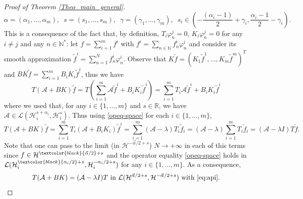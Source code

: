 \documentclass[11pt, dvipsnames]{amsart}
\begin{document}
\begin{proof}[Proof of Theorem \ref{Theo_main_general}]
\begin{equation}
\label{eq:api}
    \alpha = (\alpha_{1},...,\alpha_{m}),\;\;s = (s_{1},...,s_{m}),\;\;\gamma=(\gamma_{1},...,\gamma_{m}),\;\;s_{i}\in\left(-\frac{(\alpha_{i}-1)}{2}+\gamma_{i},\frac{\alpha_{i}-1}{2}-\gamma_{i}\right).
\end{equation}
This is a consequence of the fact that, by definition, $T_{i}\varphi_{n}^{j}=0$, $K_{i}\varphi_{n}^{j}=0$ for any $i\neq j$ and any $n\in\mathbb{N}^{*}$: let $f = \sum_{i=1}^{m}f^{i}$ with $f^{i} = \sum_{n\in\mathbb{N}}f_{n}^{i}\varphi_{n}^{i}$ and consider its smooth approximation $\tilde{f}^{i} = \sum_{n=1}^{N}f_{n}^{i}\varphi_{n}^{i}$. Observe that $K\tilde{f} =(K_{1}\tilde{f}^{1},...,K_{m}\tilde{f}^{m})^{T}$ and $BK\tilde{f} = \sum\limits_{i=1}^{m}B_{i}K_{i}\tilde{f}^{i}$, thus we have
\begin{equation}
    T(\mathcal{A}+BK)\tilde{f} = T\left(\sum\limits_{i=1}^{m}\mathcal{A}\tilde{f}^{i}+B_{i}K_{i}\tilde{f}^{i}\right) = \sum\limits_{i=1}^{m} T_{i}\mathcal{A}\tilde{f}^{i}+B_{i}K_{i}\tilde{f}^{i}
\end{equation}
where we used that, for any $i\in\{1,...,m\}$ and $s\in\mathbb{R}$, we have $\mathcal{A} \in\mathcal{L}(\mathcal{H}_{i}^{s+\alpha_{i}},\mathcal{H}^{s}_{i})$. Thus using \eqref{opeq-space} for each $i\in\{1,...,m\}$,
\begin{equation}
T(\mathcal{A}+BK)\tilde{f} = \sum\limits_{i=1}^{m} T_{i}(\mathcal{A}+B_{i}K_{i})\tilde{f}^{i} = \sum\limits_{i=1}^{m} (\mathcal{A}-\lambda) T_{i}\tilde{f}_{i} = (\mathcal{A}-\lambda) \sum\limits_{i=1}^{m} T_{i}\tilde{f}_{i}=(\mathcal{A}-\lambda I)T \tilde{f}.
\end{equation}
Note that one can pass to the limit (in $\mathcal{H}^{-\vec \alpha/2+s}$) $N\rightarrow +\infty$ in each of this terms since $f\in \mathcal{H}^{\textcolor{black}{\vec \alpha/2}+s}$ and the operator equality \eqref{opeq-space} holds in $\mathcal{L}(\mathcal{H}_{i}^{\textcolor{black}{\alpha_{i}/2}+s},\mathcal{H}_{i}^{-\alpha_{i}/2+s})$ for any $i\in\{1,...,m\}$. As a consequence, 
\begin{equation}
\label{eq:opeq-spacetot}
T(\mathcal{A}+BK) = (\mathcal{A}-\lambda I)T\text{ in }\mathcal{L}(\mathcal{H}^{\vec \alpha/2+s},\mathcal{H}^{-\vec \alpha/2+s})\text{ with \eqref{eq:api}}.
\end{equation}






\end{proof}
\end{document}
